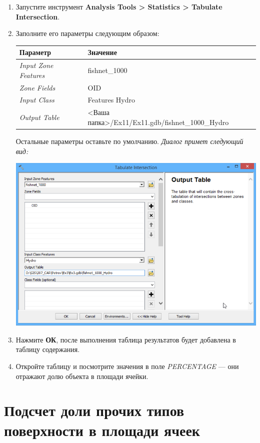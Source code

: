 \documentclass[]{book}
\theoremstyle{definition}
\theoremstyle{definition}
\theoremstyle{definition}
\theoremstyle{remark}
\begin{document}
\begin{enumerate}
\def\labelenumi{\arabic{enumi}.}
\item
  Запустите инструмент \textbf{Analysis Tools \textgreater{} Statistics
  \textgreater{} Tabulate Intersection}.
\item
  Заполните его параметры следующим образом:

  \begin{longtable}[]{@{}ll@{}}
  \toprule
  Параметр & Значение\tabularnewline
  \midrule
  \endhead
  \emph{Input Zone Features} & fishnet\_1000\tabularnewline
  \emph{Zone Fields} & OID\tabularnewline
  \emph{Input Class} & Features Hydro\tabularnewline
  \emph{Output Table} & \textless{}Ваша
  папка\textgreater{}/Ex11/Ex11.gdb/fishnet\_1000\_Hydro\tabularnewline
  \bottomrule
  \end{longtable}

  Остальные параметры оставьте по умолчанию. \emph{Диалог примет
  следующий вид:}

  \includegraphics{images/Ex11/image9.png}
\item
  Нажмите \textbf{ОК}, после выполнения таблица результатов будет
  добавлена в таблицу содержания.
\item
  Откройте таблицу и посмотрите значения в поле \emph{PERCENTAGE} ---
  они отражают долю объекта в площади ячейки.
\end{enumerate}

\hypertarget{land-cover-hydro-others}{%
\section{Подсчет доли прочих типов поверхности в площади
ячеек}\label{land-cover-hydro-others}}
\end{document}
